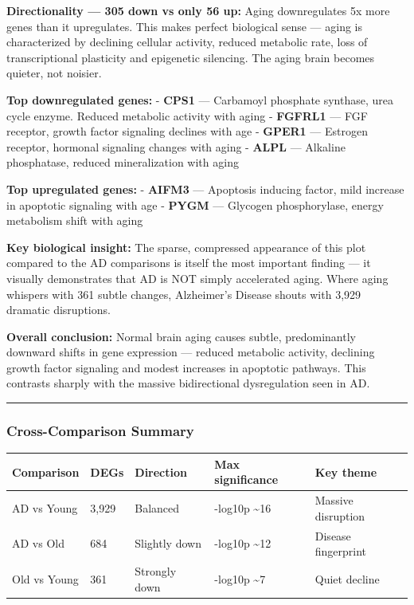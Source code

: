 \documentclass[
]{article}
\begin{document}
\textbf{Directionality --- 305 down vs only 56 up:} Aging downregulates
5x more genes than it upregulates. This makes perfect biological sense
--- aging is characterized by declining cellular activity, reduced
metabolic rate, loss of transcriptional plasticity and epigenetic
silencing. The aging brain becomes quieter, not noisier.

\textbf{Top downregulated genes:} - \textbf{CPS1} --- Carbamoyl
phosphate synthase, urea cycle enzyme. Reduced metabolic activity with
aging - \textbf{FGFRL1} --- FGF receptor, growth factor signaling
declines with age - \textbf{GPER1} --- Estrogen receptor, hormonal
signaling changes with aging - \textbf{ALPL} --- Alkaline phosphatase,
reduced mineralization with aging

\textbf{Top upregulated genes:} - \textbf{AIFM3} --- Apoptosis inducing
factor, mild increase in apoptotic signaling with age - \textbf{PYGM}
--- Glycogen phosphorylase, energy metabolism shift with aging

\textbf{Key biological insight:} The sparse, compressed appearance of
this plot compared to the AD comparisons is itself the most important
finding --- it visually demonstrates that AD is NOT simply accelerated
aging. Where aging whispers with 361 subtle changes, Alzheimer's Disease
shouts with 3,929 dramatic disruptions.

\textbf{Overall conclusion:} Normal brain aging causes subtle,
predominantly downward shifts in gene expression --- reduced metabolic
activity, declining growth factor signaling and modest increases in
apoptotic pathways. This contrasts sharply with the massive
bidirectional dysregulation seen in AD.

\begin{center}\rule{0.5\linewidth}{0.5pt}\end{center}

\subsubsection{Cross-Comparison Summary}\label{cross-comparison-summary}

\begin{longtable}[]{@{}lllll@{}}
\toprule\noalign{}
Comparison & DEGs & Direction & Max significance & Key theme \\
\midrule\noalign{}
\endhead
\bottomrule\noalign{}
\endlastfoot
AD vs Young & 3,929 & Balanced & -log10p \textasciitilde16 & Massive
disruption \\
AD vs Old & 684 & Slightly down & -log10p \textasciitilde12 & Disease
fingerprint \\
Old vs Young & 361 & Strongly down & -log10p \textasciitilde7 & Quiet
decline \\
\end{longtable}
\end{document}
